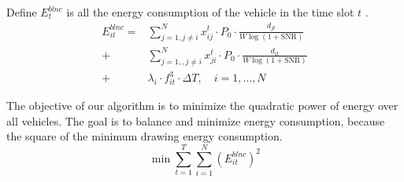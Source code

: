 \documentclass[conference]{IEEEtran}
\begin{document}
Define $E^{blnc}_ {t} $ is all the energy consumption of the vehicle in the time slot $t$ .
\begin{equation}
	\begin{aligned}
		E^{blnc} _{it}=
		&\sum_{j=1, j \ne i}^{N} x _{ij}^{t} \cdot P_0 \cdot \frac{d_{jt}}{W\log (1 + \text{SNR})}   \\
		+ &\sum_{j=1, , j \ne i}^{N} x _{ji}^{t} \cdot P_0 \cdot \frac{d_{it}}{W\log (1 + \text{SNR})}   \\
		+ &  \lambda_{i} \cdot f_{it}^{3} \cdot \Delta T
		, \quad i = 1, \dots ,N	
	\end{aligned}
\end{equation}

	The objective of our algorithm is to minimize the quadratic power of energy over all vehicles. The goal is to balance and minimize energy consumption, because the square of the minimum drawing energy consumption.
\begin{equation}
	\min\sum \limits _{t=1} ^{T} \sum \limits _{i=1}^{N} (E^{blnc}_{it} )^ 2
\end{equation}
\end{document}
